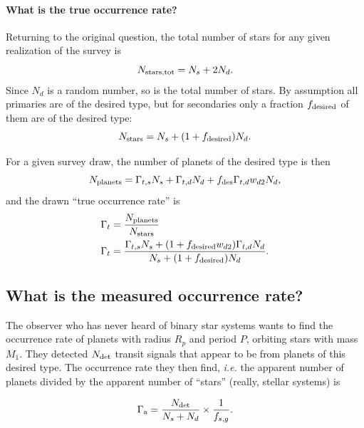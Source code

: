 \documentclass{emulateapj}
\begin{document}
\paragraph{What is the true occurrence rate?}

Returning to the original question, the total number of stars for any given 
realization of the survey is
\begin{equation}
N_{\rm stars,tot} = N_s + 2 N_d.
\end{equation}
Since $N_d$ is a random number, so is the total number of stars.
By assumption all primaries are of the desired type, but for secondaries only 
a fraction $f_{\rm desired}$ of them are of the desired type:
\begin{equation}
N_{\rm stars} = N_s + (1+f_{\rm desired}) N_d.
\end{equation}


For a given survey draw, the number of planets of the desired type is 
then
\begin{equation}
N_{\rm planets} = 
\Gamma_{t,s}N_s + \Gamma_{t,d} N_d + 
f_{\rm des}\Gamma_{t,d}w_{d2} N_d,
\end{equation}
and the drawn ``true occurrence rate'' is
\begin{align}
\Gamma_t &= \frac{ N_{\rm planets}  }{ N_{\rm stars} } \\
\Gamma_t &= 
\frac{
	\Gamma_{t,s}N_s + (1+f_{\rm desired}w_{d2})\Gamma_{t,d} N_d
	}{
	N_s + (1+f_{\rm desired}) N_d
	}.
\end{align}




\subsection{What is the measured occurrence rate?}

The observer who has never heard of binary star systems wants to find the 
occurrence rate of planets with radius $R_p$ and period $P$, orbiting stars 
with mass $M_1$.
They detected $N_{\rm det}$ transit signals that appear to be from planets of 
this desired type.
The occurrence rate they then find, {\it i.e.} the apparent number of planets 
divided by the apparent number of ``stars'' (really, stellar systems) is

\begin{equation}
\Gamma_{\rm a } =
\frac{N_{\rm det}}{N_s + N_d} \times \frac{1}{f_{s,g}}.
\end{equation}
\end{document}

